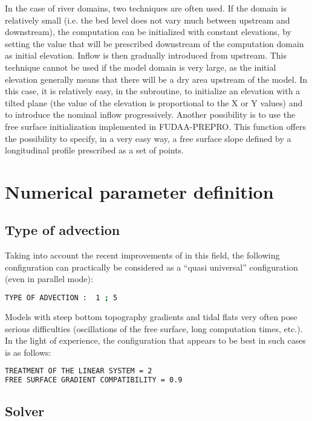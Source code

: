 In the case of river domains, two techniques are often used.
If the domain is relatively small (i.e. the bed level does not vary much
between upstream and downstream), the computation can be initialized
with constant elevations, by setting the value that will be prescribed
downstream of the computation domain as initial elevation.
Inflow is then gradually introduced from upstream.
This technique cannot be used if the model domain is very large,
as the initial elevation generally means that there will be a dry area upstream
of the model.
In this case, it is relatively easy, in the  subroutine,
to initialize an elevation with a tilted plane
(the value of the elevation is proportional to the X or Y values)
and to introduce the nominal inflow progressively.
Another possibility is to use the free surface initialization implemented
in FUDAA-PREPRO.
This function offers the possibility to specify, in a very easy way, a free
surface slope defined by a longitudinal profile prescribed as a set of points.


\section{Numerical parameter definition}

\subsection{Type of advection}

Taking into account the recent improvements of  in this field, the
following configuration can practically be considered as a ``quasi universal''
configuration (even in parallel mode):
\begin{lstlisting}[language=bash]
TYPE OF ADVECTION :  1 ; 5
\end{lstlisting}
Models with steep bottom topography gradients and tidal flats very often pose
serious difficulties (oscillations of the free surface, long computation times,
etc.).
In the light of experience, the configuration that appears to be best in such
cases is as follows:
\begin{lstlisting}[language=bash]
TREATMENT OF THE LINEAR SYSTEM = 2
FREE SURFACE GRADIENT COMPATIBILITY = 0.9
\end{lstlisting}

\subsection{Solver}

